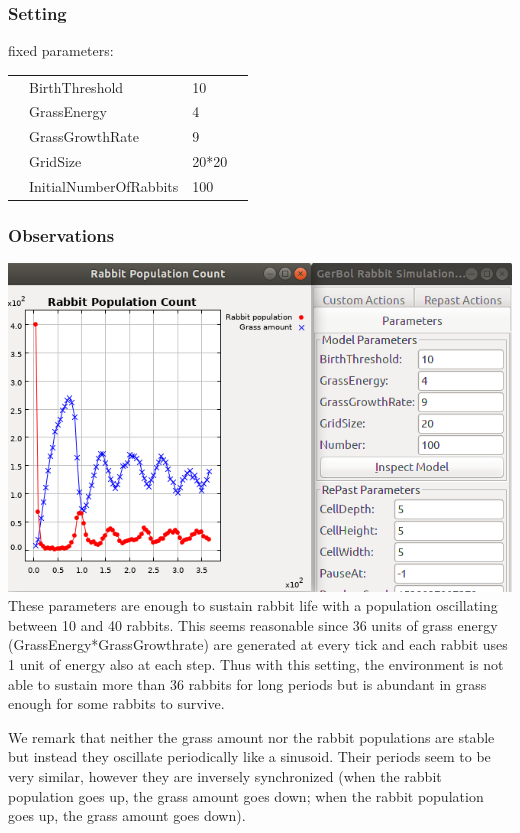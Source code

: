 \documentclass[11pt]{article}
\begin{document}
 \subsubsection{Setting}
 fixed parameters:
 \begin{table}[H]
  \begin{tabular}{llll}
   &BirthThreshold  &10\\
   &GrassEnergy  &4 \\
   &GrassGrowthRate  &9\\
   &GridSize  &20*20\\
   &InitialNumberOfRabbits  &100
  \end{tabular}
 \end{table}
 \subsubsection{Observations}
 \includegraphics[width=\textwidth]{exp1.png}
 These parameters are enough to sustain rabbit life with a population oscillating between 10 and 40 rabbits. This seems reasonable since 36 units of grass energy (GrassEnergy*GrassGrowthrate) are generated at every tick and each rabbit uses 1 unit of energy also at each step. Thus with this setting, the environment is not able to sustain more than 36 rabbits for long periods but is abundant in grass enough for some rabbits to survive.

 We remark that neither the grass amount nor the rabbit populations are stable but instead they oscillate periodically like a sinusoid. Their periods seem to be very similar, however they are inversely synchronized (when the rabbit population goes up, the grass amount goes down; when the rabbit population goes up, the grass amount goes down).
\end{document}
